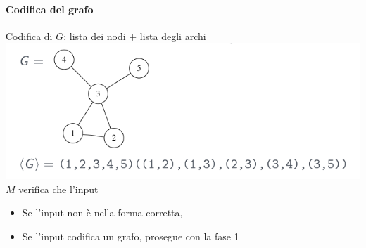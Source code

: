 \paragraph{Codifica del grafo }
Codifica di $G$: lista dei nodi $+$ lista degli archi 
\includegraphics[scale=0.5]{img/codifica_grafo.png}
$M$ verifica che l'input 
\begin{itemize}
	\item Se l'input non è nella forma corretta,  
	\item Se l'input codifica un grafo, prosegue con la fase 1
\end{itemize}
